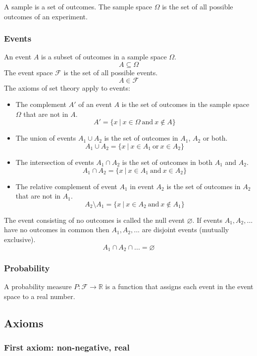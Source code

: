 \documentclass{article}
\begin{document}
A sample is a set of outcomes. The sample space $\Omega$ is the set of all possible outcomes of an experiment.

\subsubsection{Events}

An event $A$ is a subset of outcomes in a sample space $\Omega$.
\[A \subseteq \Omega\]
The event space $\mathcal{F}$ is the set of all possible events.
\[A \in \mathcal{F}\]
The axioms of set theory apply to events:
\begin{itemize}
\item The complement $A'$ of an event $A$ is the set of outcomes in the sample space $\Omega$ that are not in $A$.
\[A'= \{x \ | \ x \in \Omega \ \mathrm{and} \ x \notin A\} \]
\item The union of events $A_1 \cup A_2$ is the set of outcomes in $A_1$, $A_2$ or both.
\[A_1 \cup A_2 = \{x \ | \ x \in A_1 \ \mathrm{or} \ x \in A_2\} \]
\item The intersection of events $A_1 \cap A_2$ is the set of outcomes in both $A_1$ and $A_2$.
\[A_1 \cap A_2 = \{x \ | \ x \in A_1 \ \mathrm{and} \ x \in A_2\} \]
\item The relative complement of event $A_1$ in event $A_2$ is the set of outcomes in $A_2$ that are not in $A_1$.
\[A_2 \setminus A_1 = \{x \ | \ x \in A_2 \ \mathrm{and} \ x \notin A_1\}\]
\end{itemize}
The event consisting of no outcomes is called the null event $\varnothing$. If events $A_1, A_2, ...$ have no outcomes in common then $A_1, A_2, ...$ are disjoint events (mutually exclusive).
\[A_1 \cap A_2 \cap ... = \varnothing \]

\subsubsection{Probability}

A probability measure $P:\mathcal{F}\rightarrow \mathbb{R}$ is a function that assigns each event in the event space to a real number.

\subsection{Axioms}

\subsubsection{First axiom: non-negative, real}
\end{document}

